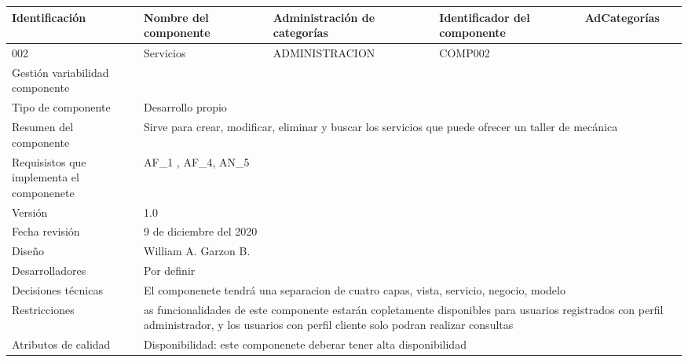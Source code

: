 \documentclass[10pt,a4paper,openany]{book}
\begin{document}
\begin{longtable}{|p{3cm}|p{3cm}|p{3cm}|p{3cm}|p{3cm}|} \hline	
Identificación & Nombre del componente & Administración de categorías & Identificador del componente & AdCategorías \\[0.5ex] \hline	
002 & Servicios & ADMINISTRACION & COMP002 &  \\[0.5ex] \hline	
Gestión variabilidad componente & \multicolumn{4}{p{12cm}|}{} \\ \hline	
Tipo de componente     & \multicolumn{4}{p{12cm}|}{Desarrollo propio} \\ \hline	
Resumen del componente & \multicolumn{4}{p{12cm}|}{Sirve para crear, modificar, eliminar y buscar los servicios que puede ofrecer un taller de mecánica} \\ \hline	
Requisistos que implementa el componenete & \multicolumn{4}{p{12cm}|}{AF\_1 , AF\_4, AN\_5 } \\ \hline	
Versión                & \multicolumn{4}{p{12cm}|}{1.0} \\ \hline	
Fecha revisión         & \multicolumn{4}{p{12cm}|}{9 de diciembre del 2020} \\ \hline	
Diseño                 & \multicolumn{4}{p{12cm}|}{William A. Garzon B.} \\ \hline	
Desarrolladores        & \multicolumn{4}{p{12cm}|}{Por definir} \\ \hline	
Decisiones técnicas    & \multicolumn{4}{p{12cm}|}{El componenete tendrá una separacion de cuatro capas, vista, servicio, negocio, modelo} \\ \hline	
Restricciones          & \multicolumn{4}{p{12cm}|}{as funcionalidades de este componente estarán copletamente disponibles para usuarios registrados con perfil administrador, y los usuarios con perfil cliente solo podran realizar consultas} \\ \hline	
Atributos de calidad   & \multicolumn{4}{p{12cm}|}{Disponibilidad: este componenete deberar tener alta disponibilidad} \\ \hline	
\end{longtable}	
\end{document}
